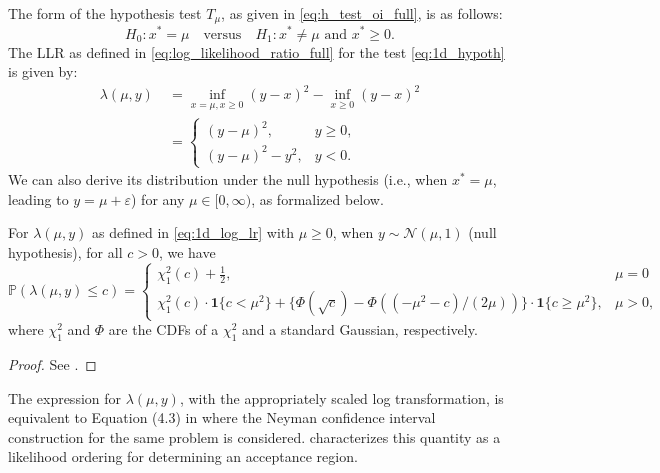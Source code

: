 \documentclass[11pt]{article}
\numberwithin{equation}{section}
\numberwithin{figure}{section}
\begin{document}
The form of the hypothesis test $T_\mu$, as given in \eqref{eq:h_test_oi_full}, is as follows:
\begin{equation} \label{eq:1d_hypoth}
    H_0: x^* = \mu \quad \text{versus} \quad H_1: x^* \neq \mu \text{ and } x^* \geq 0.
\end{equation}
The LLR as defined in \eqref{eq:log_likelihood_ratio_full} for the test \eqref{eq:1d_hypoth} is given by:
\begin{align} \label{eq:1d_log_lr}
    \lambda(\mu, y)~ &= \inf_{x = \mu, x \geq 0} (y - x)^2 - \inf_{x \geq 0} (y - x)^2 \nonumber \\
    &= \begin{cases}
        (y - \mu)^2, & y \geq 0, \\
        (y - \mu)^2 - y^2, & y < 0.
    \end{cases}
\end{align}
We can also derive its distribution under the null hypothesis (i.e., when $x^* = \mu$, leading to $y = \mu + \varepsilon$) for any $\mu \in [0, \infty)$, as formalized below.
\begin{example}
\label{lemma:1d_cdf_part1}
    For $\lambda(\mu, y)$  as defined in \eqref{eq:1d_log_lr} with $\mu \geq 0$, when $y \sim \mathcal N(\mu, 1)$ (null hypothesis),
    for all $c > 0$,
    we have
    \begin{equation*}
        \mathbb{P} (\lambda(\mu, y) \leq c ) = \begin{cases}
        \chi^2_1(c) + \frac{1}{2}, & \mu = 0 \\
        \chi^2_1(c) \cdot \bm{1} \{ c < {\mu}^2 \} + \{ \Phi (\sqrt{c}) - \Phi( {(-{\mu}^2 - c)}/(2 \mu) ) \} \cdot \bm{1} \{ c \geq {\mu}^2 \}, & \mu > 0,
        \end{cases}
    \end{equation*}
    where $\chi^2_1$ and $\Phi$ are the CDFs of a $\chi^2_1$ and a standard Gaussian, respectively.
\end{example}
\begin{proof}
   See .
\end{proof}

The expression for $\lambda(\mu, y)$, with the appropriately scaled log transformation, is equivalent to Equation (4.3) in \cite{Feldman_1998} where the Neyman confidence interval construction for the same problem is considered. 
\cite{Feldman_1998} characterizes this quantity as a likelihood ordering for determining an acceptance region. 
\end{document}
